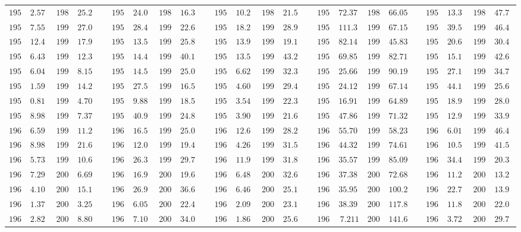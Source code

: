 \begin{landscape}
{\begin{longtable}{|r|r|r|r||c||r|r|r|r||c||r|r|r|r||c||r|r|r|r||c||r|r|r|r|}
$1952$&$ 2.578$&$1989$&$25.201$&&$1952$&$24.047$&$1989$&$16.379$&&$1952$&$10.295$&$1989$&$21.561$&&$1952$&$ 72.376$&$1989$&$ 66.052$&&$1952$&$13.310$&$1989$&$47.718$\tabularnewline
$1953$&$ 7.555$&$1990$&$27.058$&&$1953$&$28.468$&$1990$&$22.679$&&$1953$&$18.237$&$1990$&$28.980$&&$1953$&$111.307$&$1990$&$ 67.152$&&$1953$&$39.571$&$1990$&$46.464$\tabularnewline
$1954$&$12.408$&$1991$&$17.998$&&$1954$&$13.535$&$1991$&$25.811$&&$1954$&$13.967$&$1991$&$19.183$&&$1954$&$ 82.141$&$1991$&$ 45.830$&&$1954$&$20.648$&$1991$&$30.456$\tabularnewline
$1955$&$ 6.437$&$1992$&$12.376$&&$1955$&$14.482$&$1992$&$40.145$&&$1955$&$13.564$&$1992$&$43.274$&&$1955$&$ 69.854$&$1992$&$ 82.714$&&$1955$&$15.112$&$1992$&$42.687$\tabularnewline
$1956$&$ 6.042$&$1993$&$ 8.152$&&$1956$&$14.533$&$1993$&$25.071$&&$1956$&$ 6.626$&$1993$&$32.392$&&$1956$&$ 25.667$&$1993$&$ 90.198$&&$1956$&$27.183$&$1993$&$34.728$\tabularnewline
$1957$&$ 1.592$&$1994$&$14.293$&&$1957$&$27.518$&$1994$&$16.589$&&$1957$&$ 4.607$&$1994$&$29.432$&&$1957$&$ 24.126$&$1994$&$ 67.144$&&$1957$&$44.114$&$1994$&$25.625$\tabularnewline
$1958$&$ 0.815$&$1995$&$ 4.701$&&$1958$&$ 9.882$&$1995$&$18.516$&&$1958$&$ 3.549$&$1995$&$22.348$&&$1958$&$ 16.911$&$1995$&$ 64.899$&&$1958$&$18.986$&$1995$&$28.057$\tabularnewline
$1959$&$ 8.981$&$1996$&$ 7.377$&&$1959$&$40.961$&$1996$&$24.854$&&$1959$&$ 3.904$&$1996$&$21.646$&&$1959$&$ 47.864$&$1996$&$ 71.326$&&$1959$&$12.979$&$1996$&$33.986$\tabularnewline
$1960$&$ 6.599$&$1997$&$11.215$&&$1960$&$16.545$&$1997$&$25.037$&&$1960$&$12.615$&$1997$&$28.255$&&$1960$&$ 55.709$&$1997$&$ 58.232$&&$1960$&$ 6.015$&$1997$&$46.490$\tabularnewline
$1961$&$ 8.981$&$1998$&$21.649$&&$1961$&$12.059$&$1998$&$19.420$&&$1961$&$ 4.265$&$1998$&$31.503$&&$1961$&$ 44.326$&$1998$&$ 74.616$&&$1961$&$10.556$&$1998$&$41.556$\tabularnewline
$1962$&$ 5.730$&$1999$&$10.610$&&$1962$&$26.329$&$1999$&$29.745$&&$1962$&$11.948$&$1999$&$31.813$&&$1962$&$ 35.574$&$1999$&$ 85.095$&&$1962$&$34.470$&$1999$&$20.390$\tabularnewline
$1963$&$ 7.297$&$2000$&$ 6.698$&&$1963$&$16.981$&$2000$&$19.694$&&$1963$&$ 6.485$&$2000$&$32.652$&&$1963$&$ 37.381$&$2000$&$ 72.688$&&$1963$&$11.245$&$2000$&$13.267$\tabularnewline
$1964$&$ 4.104$&$2001$&$15.195$&&$1964$&$26.919$&$2001$&$36.684$&&$1964$&$ 6.464$&$2001$&$25.109$&&$1964$&$ 35.954$&$2001$&$100.248$&&$1964$&$22.761$&$2001$&$13.955$\tabularnewline
$1965$&$ 1.378$&$2002$&$ 3.257$&&$1965$&$ 6.055$&$2002$&$22.449$&&$1965$&$ 2.097$&$2002$&$23.147$&&$1965$&$ 38.390$&$2002$&$117.864$&&$1965$&$11.891$&$2002$&$22.086$\tabularnewline
$1966$&$ 2.824$&$2003$&$ 8.801$&&$1966$&$ 7.105$&$2003$&$34.007$&&$1966$&$ 1.863$&$2003$&$25.679$&&$1966$&$  7.211$&$2003$&$141.651$&&$1966$&$ 3.722$&$2003$&$29.750$\tabularnewline

\end{longtable}}
\end{landscape}
